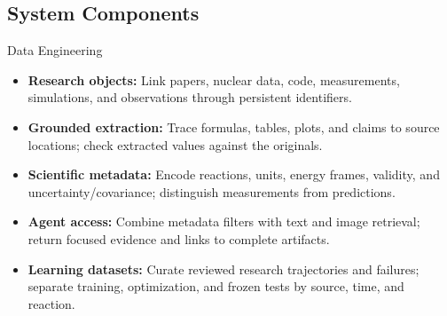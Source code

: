 \subsection{System Components}
\begin{frame}[t,label=md-47]{Data Engineering}
\small
\begin{itemize}
\setlength{\itemsep}{0.65em}
    \item \textbf{Research objects:} Link papers, nuclear data, code, measurements,
    simulations, and observations through persistent identifiers.
    \item \textbf{Grounded extraction:} Trace formulas, tables, plots, and claims
    to source locations; check extracted values against the originals.
    \item \textbf{Scientific metadata:} Encode reactions, units, energy frames,
    validity, and uncertainty/covariance; distinguish measurements from predictions.
    \item \textbf{Agent access:} Combine metadata filters with text and image
    retrieval; return focused evidence and links to complete artifacts.
    \item \textbf{Learning datasets:} Curate reviewed research trajectories and
    failures; separate training, optimization, and frozen tests by source, time,
    and reaction.
\end{itemize}
\end{frame}

